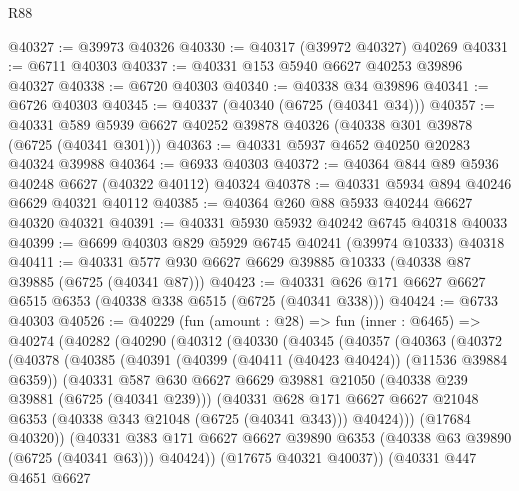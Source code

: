 \begin{lexlean}{R88}
\begin{coremodule}
@40327 := @39973 @40326
@40330 := @40317 (@39972 @40327) @40269
@40331 := @6711 @40303
@40337 := @40331 @153 @5940 @6627 @40253 @39896 @40327
@40338 := @6720 @40303
@40340 := @40338 @34 @39896
@40341 := @6726 @40303
@40345 := @40337 (@40340 (@6725 (@40341 @34)))
@40357 := @40331 @589 @5939 @6627 @40252 @39878 @40326 (@40338 @301 @39878 (@6725 (@40341 @301)))
@40363 := @40331 @5937 @4652 @40250 @20283 @40324 @39988
@40364 := @6933 @40303
@40372 := @40364 @844 @89 @5936 @40248 @6627 (@40322 @40112) @40324
@40378 := @40331 @5934 @894 @40246 @6629 @40321 @40112
@40385 := @40364 @260 @88 @5933 @40244 @6627 @40320 @40321
@40391 := @40331 @5930 @5932 @40242 @6745 @40318 @40033
@40399 := @6699 @40303 @829 @5929 @6745 @40241 (@39974 @10333) @40318
@40411 := @40331 @577 @930 @6627 @6629 @39885 @10333 (@40338 @87 @39885 (@6725 (@40341 @87)))
@40423 := @40331 @626 @171 @6627 @6627 @6515 @6353 (@40338 @338 @6515 (@6725 (@40341 @338)))
@40424 := @6733 @40303
@40526 := @40229
    (fun (amount : @28) =>
    fun (inner : @6465) =>
    @40274
      (@40282
        (@40290
          (@40312
            (@40330
              (@40345
                (@40357
                  (@40363
                    (@40372
                      (@40378
                        (@40385
                          (@40391
                            (@40399 (@40411 (@40423 @40424)) (@11536 @39884 @6359))
                            (@40331
                              @587
                              @630
                              @6627
                              @6629
                              @39881
                              @21050
                              (@40338 @239 @39881 (@6725 (@40341 @239)))
                              (@40331
                                @628
                                @171
                                @6627
                                @6627
                                @21048
                                @6353
                                (@40338 @343 @21048 (@6725 (@40341 @343)))
                                @40424)))
                          (@17684 @40320))
                        (@40331
                          @383
                          @171
                          @6627
                          @6627
                          @39890
                          @6353
                          (@40338 @63 @39890 (@6725 (@40341 @63)))
                          @40424))
                      (@17675 @40321 @40037))
                    (@40331
                      @447
                      @4651
                      @6627

\end{coremodule}
\end{lexlean}
